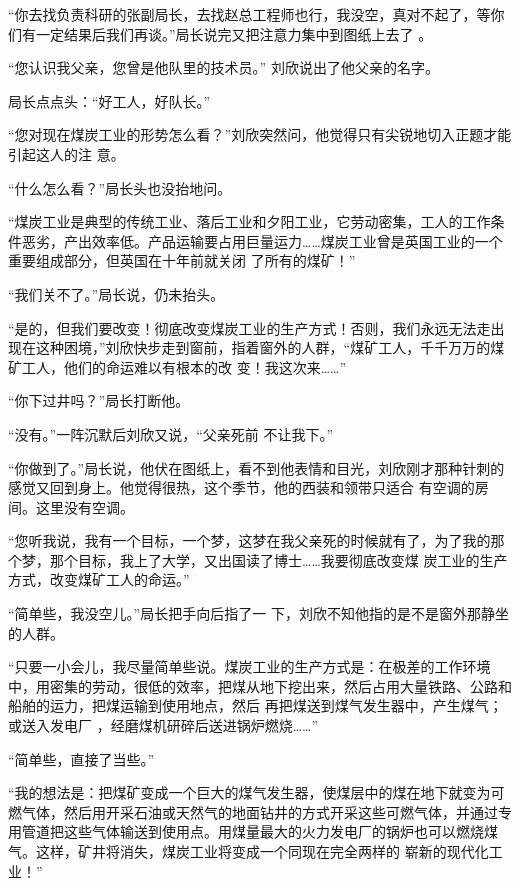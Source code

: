 \documentclass{article}
\begin{document}
“你去找负责科研的张副局长，去找赵总工程师也行，我没空，真对不起了，等你们有一定结果后我们再谈。”局长说完又把注意力集中到图纸上去了
。 

“您认识我父亲，您曾是他队里的技术员。”
刘欣说出了他父亲的名字。 


局长点点头：“好工人，好队长。” 

\newpage

“您对现在煤炭工业的形势怎么看？”刘欣突然问，他觉得只有尖锐地切入正题才能引起这人的注
意。 


“什么怎么看？”局长头也没抬地问。 

“煤炭工业是典型的传统工业、落后工业和夕阳工业，它劳动密集，工人的工作条件恶劣，产出效率低。产品运输要占用巨量运力……煤炭工业曾是英国工业的一个重要组成部分，但英国在十年前就关闭
了所有的煤矿！” 


“我们关不了。”局长说，仍未抬头。 

“是的，但我们要改变！彻底改变煤炭工业的生产方式！否则，我们永远无法走出现在这种困境，”刘欣快步走到窗前，指着窗外的人群，“煤矿工人，千千万万的煤矿工人，他们的命运难以有根本的改
变！我这次来……” 


\newpage

“你下过井吗？”局长打断他。 

“没有。”一阵沉默后刘欣又说，“父亲死前
不让我下。” 

“你做到了。”局长说，他伏在图纸上，看不到他表情和目光，刘欣刚才那种针刺的感觉又回到身上。他觉得很热，这个季节，他的西装和领带只适合
有空调的房间。这里没有空调。 

“您听我说，我有一个目标，一个梦，这梦在我父亲死的时候就有了，为了我的那个梦，那个目标，我上了大学，又出国读了博士……我要彻底改变煤
炭工业的生产方式，改变煤矿工人的命运。” 

“简单些，我没空儿。”局长把手向后指了一
下，刘欣不知他指的是不是窗外那静坐的人群。 

“只要一小会儿，我尽量简单些说。煤炭工业的生产方式是：在极差的工作环境中，用密集的劳动，很低的效率，把煤从地下挖出来，然后占用大量铁路、公路和船舶的运力，把煤运输到使用地点，然后
\newpage
再把煤送到煤气发生器中，产生煤气；或送入发电厂
，经磨煤机研碎后送进锅炉燃烧……” 


“简单些，直接了当些。” 

“我的想法是：把煤矿变成一个巨大的煤气发生器，使煤层中的煤在地下就变为可燃气体，然后用开采石油或天然气的地面钻井的方式开采这些可燃气体，并通过专用管道把这些气体输送到使用点。用煤量最大的火力发电厂的锅炉也可以燃烧煤气。这样，矿井将消失，煤炭工业将变成一个同现在完全两样的
崭新的现代化工业！” 
\end{document}
